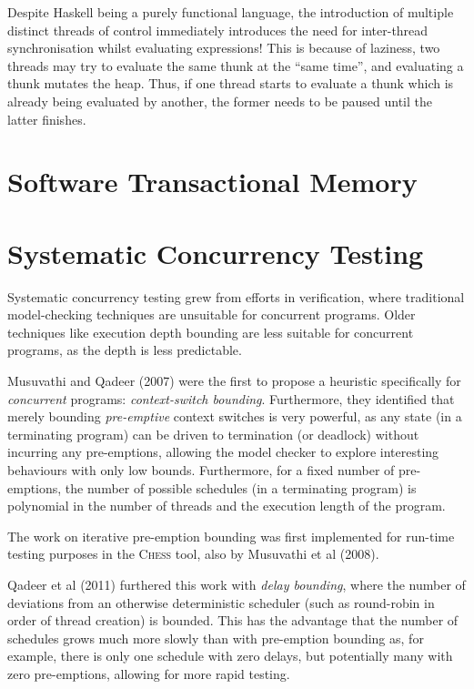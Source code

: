 Despite Haskell being a purely functional language, the introduction
of multiple distinct threads of control immediately introduces the
need for inter-thread synchronisation whilst evaluating
expressions\cite{concurrent}! This is because of laziness, two threads
may try to evaluate the same thunk at the ``same time'', and
evaluating a thunk mutates the heap. Thus, if one thread starts to
evaluate a thunk which is already being evaluated by another, the
former needs to be paused until the latter finishes.

\section{Software Transactional Memory}
\label{sec:litrev-stm}

\section{Systematic Concurrency Testing}
\label{sec:litrev-sct}

Systematic concurrency testing grew from efforts in
verification\cite{pbound}, where traditional model-checking techniques
are unsuitable for concurrent programs. Older techniques like
execution depth bounding are less suitable for concurrent programs, as
the depth is less predictable.

Musuvathi and Qadeer (2007) were the first to propose a heuristic
specifically for \textit{concurrent} programs: \textit{context-switch
  bounding}. Furthermore, they identified that merely bounding
\textit{pre-emptive} context switches is very powerful, as any state
(in a terminating program) can be driven to termination (or deadlock)
without incurring any pre-emptions, allowing the model checker to
explore interesting behaviours with only low bounds. Furthermore, for
a fixed number of pre-emptions, the number of possible schedules (in a
terminating program) is polynomial in the number of threads and the
execution length of the program.

The work on iterative pre-emption bounding was first implemented for
run-time testing purposes in the \textsc{Chess}\cite{heisenbugs} tool,
also by Musuvathi et al (2008).

Qadeer et al (2011) furthered this work with \textit{delay bounding},
where the number of deviations from an otherwise deterministic
scheduler (such as round-robin in order of thread creation) is
bounded. This has the advantage that the number of schedules grows
much more slowly than with pre-emption bounding as, for example, there
is only one schedule with zero delays, but potentially many with zero
pre-emptions, allowing for more rapid testing.

